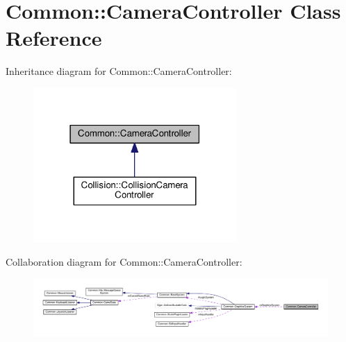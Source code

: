 \hypertarget{class_common_1_1_camera_controller}{}\section{Common\+:\+:Camera\+Controller Class Reference}
\label{class_common_1_1_camera_controller}


Inheritance diagram for Common\+:\+:Camera\+Controller\+:\nopagebreak
\begin{figure}[H]
\begin{center}
\leavevmode
\includegraphics[width=219pt]{class_common_1_1_camera_controller__inherit__graph}
\end{center}
\end{figure}


Collaboration diagram for Common\+:\+:Camera\+Controller\+:\nopagebreak
\begin{figure}[H]
\begin{center}
\leavevmode
\includegraphics[width=350pt]{class_common_1_1_camera_controller__coll__graph}
\end{center}
\end{figure}
